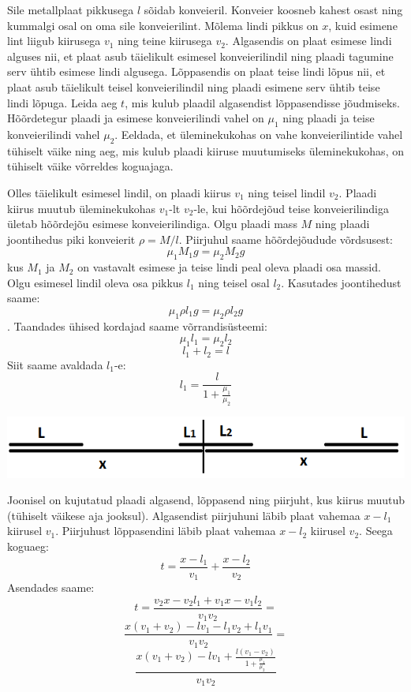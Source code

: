 \setAuthor{}

Sile metallplaat pikkusega $l$ sõidab konveieril. Konveier koosneb kahest osast ning kummalgi osal on oma sile konveierilint. Mõlema lindi pikkus on $x$, kuid esimene lint liigub kiirusega $v_1$ ning teine kiirusega $v_2$. Algasendis on plaat esimese lindi alguses nii, et plaat asub täielikult esimesel konveierilindil ning plaadi tagumine serv ühtib esimese lindi algusega. Lõppasendis on plaat teise lindi lõpus nii, et plaat asub täielikult teisel konveierilindil ning plaadi esimene serv ühtib teise lindi lõpuga. Leida aeg $t$, mis kulub plaadil algasendist lõppasendisse jõudmiseks. Hõõrdetegur plaadi ja esimese konveierilindi vahel on $\mu_{1}$ ning plaadi ja teise konveierilindi vahel $\mu_{2}$. Eeldada, et üleminekukohas on vahe konveierilintide vahel tühiselt väike ning aeg, mis kulub plaadi kiiruse muutumiseks üleminekukohas, on tühiselt väike võrreldes koguajaga. 



\hint

\solu
Olles täielikult esimesel lindil, on plaadi kiirus $v_1$ ning teisel lindil $v_2$. Plaadi kiirus muutub üleminekukohas $v_1$-lt $v_2$-le, kui hõõrdejõud teise konveierilindiga ületab hõõrdejõu esimese konveierilindiga. Olgu plaadi mass $M$ ning plaadi joontihedus piki konveierit $\rho = M/l$. Piirjuhul saame hõõrdejõudude võrdsusest:
$$\mu_{1}M_1g = \mu_{2}M_2g$$
kus $M_1$ ja $M_2$ on vastavalt esimese ja teise lindi peal oleva plaadi osa massid. Olgu esimesel lindil oleva osa pikkus $l_1$ ning teisel osal $l_2$. Kasutades joontihedust saame:
$$\mu_{1} \rho l_1 g = \mu_{2}\rho l_2 g$$.
Taandades ühised kordajad saame võrrandisüsteemi:
$$\mu_{1} l_1 = \mu_{2} l_2$$
$$l_1 + l_2 = l$$
Siit saame avaldada $l_1$-e:
$$l_1 = \frac{l}{1+\frac{\mu_{1}}{\mu_{2}}}$$

\begin{center}
\includegraphics[scale=0.5]{2019-v3g-04-sol.png}
\end{center}


Joonisel on kujutatud plaadi algasend, lõppasend ning piirjuht, kus kiirus muutub (tühiselt väikese aja jooksul). Algasendist piirjuhuni läbib plaat vahemaa $x - l_1$ kiirusel $v_1$. Piirjuhust lõppasendini läbib plaat vahemaa $x - l_2$ kiirusel $v_2$. Seega koguaeg:
$$t = \frac{x - l_1}{v_1} + \frac{x - l_2}{v_2}$$
Asendades saame:
$$t=\frac{v_2 x - v_2 l_1 + v_1 x - v_1 l_2}{v_1 v_2} =$$
$$\frac{x(v_1 + v_2) - lv_1 - l_1 v_2 + l_1 v_1}{v_1 v_2} =$$
$$\frac{x(v_1 + v_2) - lv_1 + \frac{l(v_1 - v_2)}{1+\frac{\mu_{1}}{\mu_{2}}}}{v_1 v_2}$$
\probend